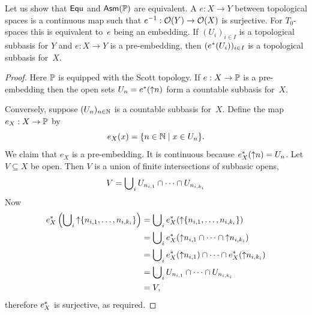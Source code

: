 Let us show that $\mathsf{Equ}$ and $\mathsf{Asm}(\mathbb{P})$ are equivalent. A
 $e : X \to Y$ between topological spaces is a
continuous map such that ${e}^{-1} : \mathcal{O}(Y) \to \mathcal{O}(X)$ is
surjective. For $T_0$-spaces this is equivalent to~$e$ being an
embedding. If $(U_i)_{i \in I}$ is a topological subbasis for $Y$ and
$e : X \to Y$ is a pre-embedding, then $(e^{*}(U_i))_{i \in I}$ is
a topological subbasis for~$X$.


\begin{proof}
  Here $\mathbb{P}$ is equipped with the Scott topology. If $e : X \to
  \mathbb{P}$ is a pre-embedding then the open sets $U_n =
  e^{*}({\uparrow}n)$ form a countable subbasis for~$X$.

  Conversely, suppose $(U_n)_{n \in \mathbb{N}}$ is a countable subbasis
  for~$X$. Define the map $e_X : X \to \mathbb{P}$ by
  \begin{equation*}
    e_X(x) = \{n \in \mathbb{N} \mid x \in U_n\}.
  \end{equation*}
  We claim that $e_X$ is a pre-embedding. It is continuous because
  $e_X^{*}({\uparrow}n) = U_n$. Let $V \subseteq X$ be open. Then 
  $V$ is a union of finite intersections of subbasic opens,
  \begin{equation*}
    V = \bigcup\nolimits_i U_{n_{i,1}} \cap \cdots \cap U_{n_{i,k_i}}
  \end{equation*}
  Now
  \begin{align*}
    e_X^{*}\left(\bigcup\nolimits_i {\uparrow}\{n_{i,1}, \ldots, n_{i,k_i}\}\right) &=
      \bigcup\nolimits_i e_X^{*}({\uparrow}\{n_{i,1}, \ldots, n_{i,k_i}\})
      \\
      &=
      \bigcup\nolimits_i e_X^{*}({\uparrow}n_{i,1} \cap \cdots \cap {\uparrow}n_{i,k_i})
      \\
      &=
      \bigcup\nolimits_i e_X^{*}({\uparrow}n_{i,1}) \cap \cdots \cap e_X^{*}({\uparrow}n_{i,k_i})
      \\
      &=
      \bigcup\nolimits_i U_{n_{i,1}} \cap \cdots \cap U_{n_{i,k_i}} \\
      &= V,
  \end{align*}
  therefore $e_X^{*}$ is surjective, as required.
\end{proof}

